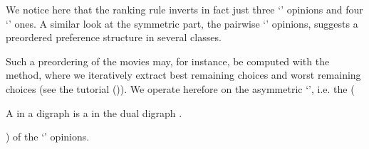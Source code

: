 \documentclass[a4paper,10pt,english]{sphinxhowto}
\let\sphinxpxdimen\pdfpxdimen\else\newdimen\sphinxpxdimen
\begin{document}
We notice here that the  ranking rule inverts in fact just three ‘’ opinions and four ‘’ ones. A similar look at the symmetric part, the pairwise ‘’ opinions, suggests a preordered preference structure in several  classes.

\begin{sphinxVerbatim}[commandchars=\\\{\}]
  
\end{sphinxVerbatim}

\noindent{\hspace*{\fill}\sphinxincludegraphics[width=600\sphinxpxdimen]{{symmetricPart}.png}\hspace*{\fill}}

Such a preordering of the movies may, for instance, be computed with the  method, where we iteratively extract  \sphinxhyphen{}best remaining choices\sphinxhyphen{} and  \sphinxhyphen{}worst remaining choices\sphinxhyphen{} (see the tutorial {\hyperref[\detokenize{tutorial:kernel-tutorial-label}]{}} ()). We operate herefore on the asymmetric ‘’, i.e. the  (%
\begin{footnote}[11]\sphinxAtStartFootnote
A  in a digraph  is a  in the dual digraph .
%
\end{footnote}) of the ‘’ opinions.
\end{document}
